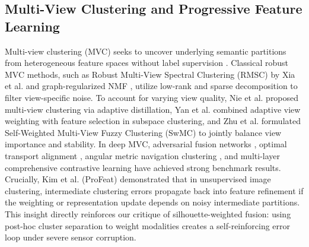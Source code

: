 \documentclass[11pt, a4paper]{article}
\begin{document}
\subsection{Multi-View Clustering and Progressive Feature Learning}
\label{subsec:rw_mvc}
Multi-view clustering (MVC) seeks to uncover underlying semantic partitions from heterogeneous feature spaces without label supervision \cite{chao2021survey, wang2024self, chowdhury2025deep, fang2023comprehensive}. Classical robust MVC methods, such as Robust Multi-View Spectral Clustering (RMSC) by Xia et al. \cite{xia2014robust} and graph-regularized NMF \cite{zhang2018multi, xu2021multi}, utilize low-rank and sparse decomposition to filter view-specific noise. To account for varying view quality, Nie et al. \cite{nie2020multiview} proposed multi-view clustering via adaptive distillation, Yan et al. \cite{yan2020adaptive} combined adaptive view weighting with feature selection in subspace clustering, and Zhu et al. \cite{zhu2020self} formulated Self-Weighted Multi-View Fuzzy Clustering (SwMC) to jointly balance view importance and stability. In deep MVC, adversarial fusion networks \cite{wang2022adversarial}, optimal transport alignment \cite{zhang2024learning, lin2023multi}, angular metric navigation clustering \cite{shi2022deep, shi2023deep, shen2023analysis}, and multi-layer comprehensive contrastive learning \cite{chen2025multi} have achieved strong benchmark results. Crucially, Kim et al. (ProFeat) \cite{kim2022profeat} demonstrated that in unsupervised image clustering, intermediate clustering errors propagate back into feature refinement if the weighting or representation update depends on noisy intermediate partitions. This insight directly reinforces our critique of silhouette-weighted fusion: using post-hoc cluster separation to weight modalities creates a self-reinforcing error loop under severe sensor corruption.
\end{document}
